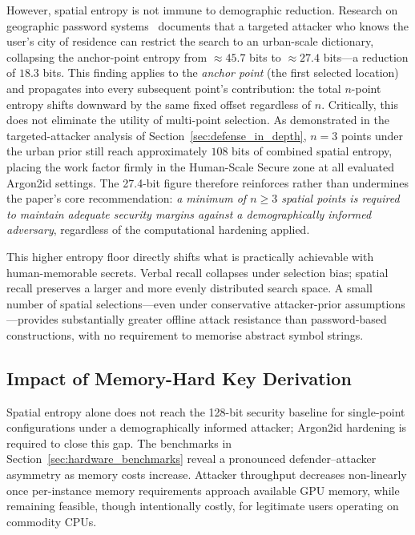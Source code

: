 \documentclass[journal,article,accept,pdftex,moreauthors]{Definitions/mdpi}
\begin{document}
However, spatial entropy is not immune to demographic reduction. Research on geographic password systems~\cite{Sun2012, Thorpe2013, AlAmeen2014} documents that a targeted attacker who knows the user's city of residence can restrict the search to an urban-scale dictionary, collapsing the anchor-point entropy from $\approx\!45.7$ bits to $\approx\!27.4$ bits---a reduction of $18.3$ bits. This finding applies to the \emph{anchor point} (the first selected location) and propagates into every subsequent point's contribution: the total $n$-point entropy shifts downward by the same fixed offset regardless of $n$. Critically, this does not eliminate the utility of multi-point selection. As demonstrated in the targeted-attacker analysis of Section~\ref{sec:defense_in_depth}, $n=3$ points under the urban prior still reach approximately $108$ bits of combined spatial entropy, placing the work factor firmly in the Human-Scale Secure zone at all evaluated Argon2id settings. The 27.4-bit figure therefore reinforces rather than undermines the paper's core recommendation: \emph{a minimum of $n \geq 3$ spatial points is required to maintain adequate security margins against a demographically informed adversary}, regardless of the computational hardening applied.

This higher entropy floor directly shifts what is practically achievable with human-memorable secrets. Verbal recall collapses under selection bias; spatial recall preserves a larger and more evenly distributed search space. A small number of spatial selections---even under conservative attacker-prior assumptions---provides substantially greater offline attack resistance than password-based constructions, with no requirement to memorise abstract symbol strings.

\subsection{Impact of Memory-Hard Key Derivation}

Spatial entropy alone does not reach the 128-bit security baseline for single-point configurations under a demographically informed attacker; Argon2id hardening is required to close this gap. The benchmarks in Section~\ref{sec:hardware_benchmarks} reveal a pronounced defender--attacker asymmetry as memory costs increase. Attacker throughput decreases non-linearly once per-instance memory requirements approach available GPU memory, while remaining feasible, though intentionally costly, for legitimate users operating on commodity CPUs.
\end{document}
